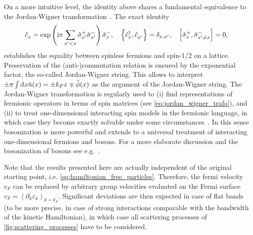 On a more intuitive level, the identity above shares a fundamental equivalence to the Jordan-Wigner transformation~\cite{Jordan1928}.
The exact identity
\begin{align}
    \hat c^\pdag_x=\exp\brlr{\ri\pi\sum_{x'<x}\hat \sigma^+_{x'}\hat \sigma^-_{x'}}\hat \sigma^-_x
    ,\quad
    \anticommutator{\hat c^\dag_x,\hat c^\pdag_{x'}}=\delta_{x,x'}
    ,\quad
    \commutator{\hat \sigma^+_x,\hat \sigma^-_{x'\neq x}}=0
    ,
\end{align}
establishes the equality between spinless fermions and spin-1/2 on a lattice.
Preservation of the (anti-)commutation relation is ensured by the exponential factor, the so-called Jordan-Wigner string.
This allows to interpret $\pm\pi\int\mathrm d x\hat n(x) = \pm k_F x\mp\hat\phi(x)$ as the argument of the Jordan-Wigner string.
The Jordan-Wigner transformation is regularly used to (i) find representations of fermionic operators in terms of spin matrices (see \cref{eq:jordan_wigner_trafo}), and (ii) to treat one-dimensional interacting spin models in the fermionic language, in which case they become exactly solvable under some circumstances~\cite{Lieb1961}.
In this sense bosonization is more powerful and extends to a universal treatment of interacting one-dimensional fermions and bosons.
For a more elaborate discussion and the bosonization of bosons see e.g.~\cite{Cazalilla2004}.

Note that the results presented here are actually independent of the original starting point, i.e. \cref{eq:hamiltonian_free_particles}.
Therefore, the fermi velocity $v_F$ can be replaced by arbitrary group velocities evaluated on the Fermi surface $v_F=(\partial_k\varepsilon_k)_{k=k_F}$.
Significant deviations are then expected in case of flat bands (to be more precise, in case of strong interactions comparable with the bandwidth of the kinetic Hamiltonian), in which case all scattering processes of \cref{fig:scattering_processes} have to be considered.

